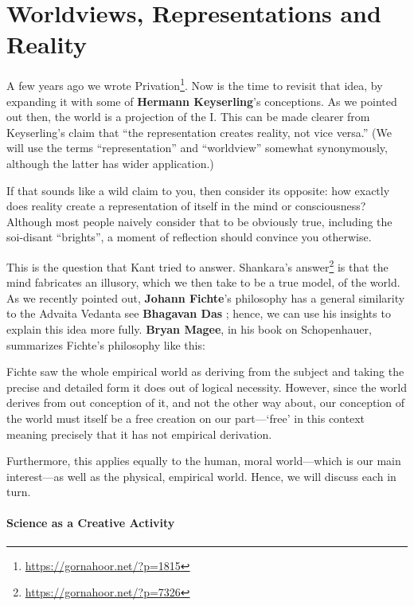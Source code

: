 \section{Worldviews, Representations and Reality}

A few years ago we wrote Privation\footnote{\url{https://gornahoor.net/?p=1815}}. Now is the time to revisit that idea, by expanding it with some of \textbf{Hermann Keyserling}'s conceptions. As we pointed out then, the world is a projection of the I. This can be made clearer from Keyserling's claim that ``the representation creates reality, not vice versa.'' (We will use the terms ``representation'' and ``worldview'' somewhat synonymously, although the latter has wider application.)

If that sounds like a wild claim to you, then consider its opposite: how exactly does reality create a representation of itself in the mind or consciousness? Although most people naively consider that to be obviously true, including the soi-disant ``brights'', a moment of reflection should convince you otherwise.

This is the question that Kant tried to answer. Shankara's answer\footnote{\url{https://gornahoor.net/?p=7326}} is that the mind fabricates an illusory, which we then take to be a true model, of the world. As we recently pointed out, \textbf{Johann Fichte}'s philosophy has a general similarity to the Advaita Vedanta see \textbf{Bhagavan Das} ; hence, we can use his insights to explain this idea more fully. \textbf{Bryan Magee}, in his book on Schopenhauer, summarizes Fichte's philosophy like this:

\begin{quotex} 
Fichte saw the whole empirical world as deriving from the subject and taking the precise and detailed form it does out of logical necessity. However, since the world derives from out conception of it, and not the other way about, our conception of the world must itself be a free creation on our part---`free' in this context meaning precisely that it has not empirical derivation.
\end{quotex}


Furthermore, this applies equally to the human, moral world---which is our main interest---as well as the physical, empirical world. Hence, we will discuss each in turn.

\paragraph{Science as a Creative Activity}


